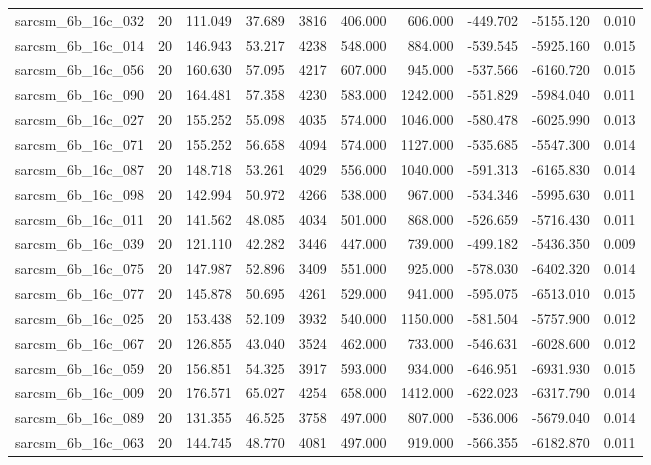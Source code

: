 \begin{tabular}{lrrrrrrrrr}
sarcsm\_6b\_16c\_032 & 20 & 111.049 & 37.689 & 3816 & 406.000 & 606.000 & -449.702 & -5155.120 & 0.010 \\
sarcsm\_6b\_16c\_014 & 20 & 146.943 & 53.217 & 4238 & 548.000 & 884.000 & -539.545 & -5925.160 & 0.015 \\
sarcsm\_6b\_16c\_056 & 20 & 160.630 & 57.095 & 4217 & 607.000 & 945.000 & -537.566 & -6160.720 & 0.015 \\
sarcsm\_6b\_16c\_090 & 20 & 164.481 & 57.358 & 4230 & 583.000 & 1242.000 & -551.829 & -5984.040 & 0.011 \\
sarcsm\_6b\_16c\_027 & 20 & 155.252 & 55.098 & 4035 & 574.000 & 1046.000 & -580.478 & -6025.990 & 0.013 \\
sarcsm\_6b\_16c\_071 & 20 & 155.252 & 56.658 & 4094 & 574.000 & 1127.000 & -535.685 & -5547.300 & 0.014 \\
sarcsm\_6b\_16c\_087 & 20 & 148.718 & 53.261 & 4029 & 556.000 & 1040.000 & -591.313 & -6165.830 & 0.014 \\
sarcsm\_6b\_16c\_098 & 20 & 142.994 & 50.972 & 4266 & 538.000 & 967.000 & -534.346 & -5995.630 & 0.011 \\
sarcsm\_6b\_16c\_011 & 20 & 141.562 & 48.085 & 4034 & 501.000 & 868.000 & -526.659 & -5716.430 & 0.011 \\
sarcsm\_6b\_16c\_039 & 20 & 121.110 & 42.282 & 3446 & 447.000 & 739.000 & -499.182 & -5436.350 & 0.009 \\
sarcsm\_6b\_16c\_075 & 20 & 147.987 & 52.896 & 3409 & 551.000 & 925.000 & -578.030 & -6402.320 & 0.014 \\
sarcsm\_6b\_16c\_077 & 20 & 145.878 & 50.695 & 4261 & 529.000 & 941.000 & -595.075 & -6513.010 & 0.015 \\
sarcsm\_6b\_16c\_025 & 20 & 153.438 & 52.109 & 3932 & 540.000 & 1150.000 & -581.504 & -5757.900 & 0.012 \\
sarcsm\_6b\_16c\_067 & 20 & 126.855 & 43.040 & 3524 & 462.000 & 733.000 & -546.631 & -6028.600 & 0.012 \\
sarcsm\_6b\_16c\_059 & 20 & 156.851 & 54.325 & 3917 & 593.000 & 934.000 & -646.951 & -6931.930 & 0.015 \\
sarcsm\_6b\_16c\_009 & 20 & 176.571 & 65.027 & 4254 & 658.000 & 1412.000 & -622.023 & -6317.790 & 0.014 \\
sarcsm\_6b\_16c\_089 & 20 & 131.355 & 46.525 & 3758 & 497.000 & 807.000 & -536.006 & -5679.040 & 0.014 \\
sarcsm\_6b\_16c\_063 & 20 & 144.745 & 48.770 & 4081 & 497.000 & 919.000 & -566.355 & -6182.870 & 0.011 \\

\end{tabular}
